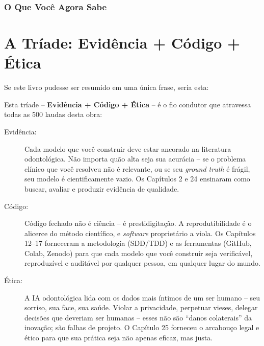 \subsubsection{O Que Você Agora Sabe}

\section{A Tríade: Evidência + Código + Ética}
\label{sec:triade}

\nivelcinco

Se este livro pudesse ser resumido em uma única frase, seria esta:


Esta tríade -- \textbf{Evidência + Código + Ética} -- é o fio condutor que
atravessa todas as 500 laudas desta obra:

\begin{description}
  \item[Evidência:] Cada modelo que você construir deve estar ancorado na
    literatura odontológica. Não importa quão alta seja sua acurácia -- se o
    problema clínico que você resolveu não é relevante, ou se seu \textit{
    ground truth} é frágil, seu modelo é cientificamente vazio. Os Capítulos 2
    e 24 ensinaram como buscar, avaliar e produzir evidência de qualidade.

  \item[Código:] Código fechado não é ciência -- é prestidigitação. A
    reprodutibilidade é o alicerce do método científico, e \textit{software}
    proprietário a viola. Os Capítulos 12--17 forneceram a metodologia (SDD/TDD)
    e as ferramentas (GitHub, Colab, Zenodo) para que cada modelo que você
    construir seja verificável, reproduzível e auditável por qualquer pessoa,
    em qualquer lugar do mundo.

  \item[Ética:] A IA odontológica lida com os dados mais íntimos de um ser
    humano -- seu sorriso, sua face, sua saúde. Violar a privacidade, perpetuar
    vieses, delegar decisões que deveriam ser humanas -- esses não são ``danos
    colaterais'' da inovação; são falhas de projeto. O Capítulo 25 forneceu o
    arcabouço legal e ético para que sua prática seja não apenas eficaz, mas
    justa.
\end{description}


